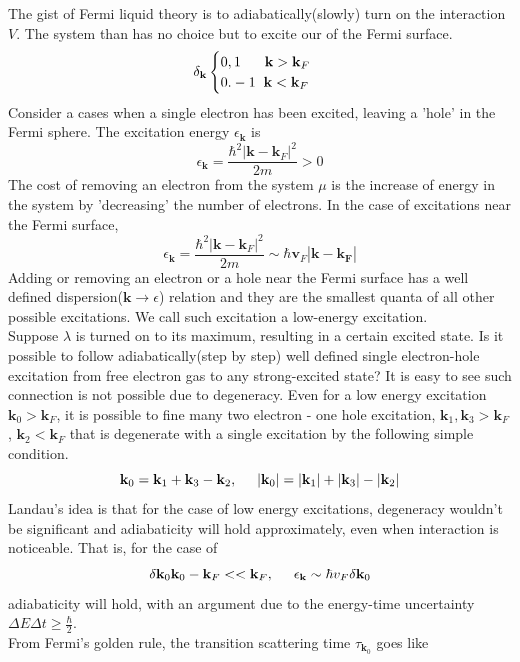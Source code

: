 \documentclass{article}
\begin{document}
The gist of Fermi liquid theory is to adiabatically(slowly) turn on the interaction $V$. The system than has no choice but to excite our of the Fermi surface.
$$\delta _{\mathbf{k}}
	\begin{cases}
		0,1\hspace{6mm}\mathbf{k}>\mathbf{k}_F \\
		0.-1\hspace{2mm}\mathbf{k}<\mathbf{k}_F
	\end{cases}
$$
Consider a cases when a single electron has been excited, leaving a 'hole' in the Fermi sphere. The excitation energy $\epsilon_{\mathbf{k}}$ is
$$\epsilon_{\mathbf{k}}=\frac{\hbar^2|\mathbf{k}-\mathbf{k}_F|^2}{2m}>0$$
The cost of removing an electron from the system $\mu$ is the increase of energy in the system by 'decreasing' the number of electrons. In the case of excitations near the Fermi surface,
$$\epsilon_{\mathbf{k}}=\frac{\hbar^2|\mathbf{k}-\mathbf{k}_F|^2}{2m}\sim\hbar\mathbf{v}_F|\mathbf{k-\mathbf{k_F}}|$$
Adding or removing an electron or a hole near the Fermi surface has a well defined dispersion($\mathbf{k}\to\epsilon$) relation and they are the smallest quanta of all other possible excitations. We call such excitation a low-energy excitation.\\
Suppose $\lambda$ is turned on to its maximum, resulting in a certain excited state. Is it possible to follow adiabatically(step by step) well defined single electron-hole excitation from free electron gas to any strong-excited state? It is easy to see such connection is not possible due to degeneracy. Even for a low energy excitation $\mathbf{k}_0>\mathbf{k}_F$, it is possible to fine many two electron - one hole excitation, $\mathbf{k}_1,\mathbf{k}_3>\mathbf{k}_F$, $\mathbf{k}_2<\mathbf{k}_F$ that is degenerate with a single excitation by the following simple condition.
$$\mathbf{k}_0=\mathbf{k}_1+\mathbf{k}_3-\mathbf{k}_2, \hspace{5mm}|\mathbf{k}_0|=|\mathbf{k}_1|+|\mathbf{k}_3|-|\mathbf{k}_2|$$
Landau's idea is that for the case of low energy excitations, degeneracy wouldn't be significant and adiabaticity will hold approximately, even when interaction is noticeable. That is, for the case of
$$\delta\mathbf{k}_0\mathbf{k}_0-\mathbf{k}_F<<\mathbf{k}_F, \hspace{5mm}\epsilon_{\mathbf{k}}\sim\hbar v_{F}\delta\mathbf{k}_0$$
adiabaticity will hold, with an argument due to the energy-time uncertainty $\Delta E\Delta t\geq\frac{\hbar}{2}$.\\
From Fermi's golden rule, the transition scattering time $\tau_{\mathbf{k}_0}$ goes like
\end{document}
